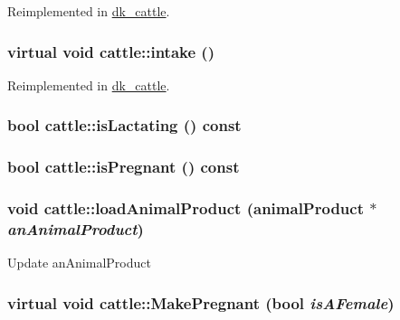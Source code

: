 Reimplemented in \hyperlink{classdk__cattle_aa0979fed4c6facc5d1dbd86c38faaa13}{dk\_\-cattle}.\hypertarget{classcattle_a268ab4ca694f20f0207125ef11992933}{
\subsubsection[{intake}]{\setlength{\rightskip}{0pt plus 5cm}virtual void cattle::intake ()}}
\label{classcattle_a268ab4ca694f20f0207125ef11992933}


Reimplemented in \hyperlink{classdk__cattle_ac26882672df3b641aa96104dcb4eccef}{dk\_\-cattle}.\hypertarget{classcattle_a45e30956734fd3fba35da661cf4198e2}{
\subsubsection[{isLactating}]{\setlength{\rightskip}{0pt plus 5cm}bool cattle::isLactating () const}}
\label{classcattle_a45e30956734fd3fba35da661cf4198e2}
\hypertarget{classcattle_abbe4b4f1b07cee30b41122bcad34ea48}{
\subsubsection[{isPregnant}]{\setlength{\rightskip}{0pt plus 5cm}bool cattle::isPregnant () const}}
\label{classcattle_abbe4b4f1b07cee30b41122bcad34ea48}
\hypertarget{classcattle_a380c56c03be73c2b0bc0ce6f999a499e}{
\subsubsection[{loadAnimalProduct}]{\setlength{\rightskip}{0pt plus 5cm}void cattle::loadAnimalProduct ({\bf animalProduct} $\ast$ {\em anAnimalProduct})}}
\label{classcattle_a380c56c03be73c2b0bc0ce6f999a499e}
Update anAnimalProduct \hypertarget{classcattle_adec0490651ec7d3cfb5b90250dd42dc0}{
\subsubsection[{MakePregnant}]{\setlength{\rightskip}{0pt plus 5cm}virtual void cattle::MakePregnant (bool {\em isAFemale})}}
\label{classcattle_adec0490651ec7d3cfb5b90250dd42dc0}


